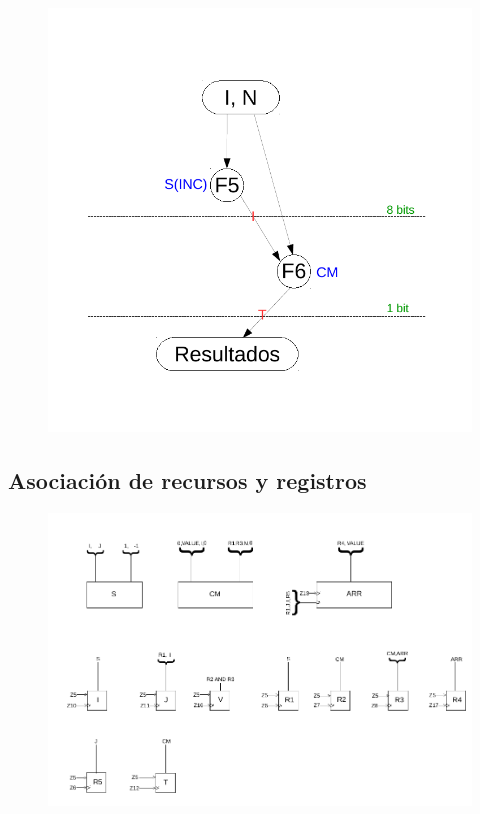 \documentclass[12pt,a4paper,oneside]{article}
\begin{document}
\begin{figure}[H]
    \includegraphics[width = \textwidth]{esquema2.pdf}
\end{figure}

\subsection{Asociación de recursos y registros}
\begin{figure}[H]
    \includegraphics[width = \textwidth]{asignacion-recursos.pdf}
\end{figure}
\end{document}
